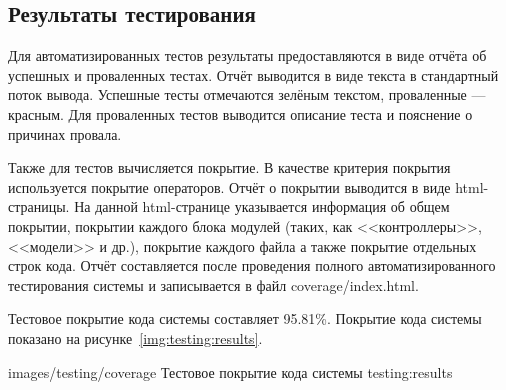 \subsection{Результаты тестирования}

Для автоматизированных тестов результаты предоставляются в виде отчёта об успешных и проваленных тестах. Отчёт выводится в виде текста в стандартный поток вывода. Успешные тесты отмечаются зелёным текстом, проваленные --- красным. Для проваленных тестов выводится описание теста и пояснение о причинах провала.

Также для тестов вычисляется покрытие. В качестве критерия покрытия используется покрытие операторов. Отчёт о покрытии выводится в виде html-страницы. На данной html-странице указывается информация об общем покрытии, покрытии каждого блока модулей (таких, как <<контроллеры>>, <<модели>> и др.), покрытие каждого файла а также покрытие отдельных строк кода. Отчёт составляется после проведения полного автоматизированного тестирования системы и записывается в файл coverage/index.html.

Тестовое покрытие кода системы составляет 95.81\%. Покрытие кода системы показано на рисунке~\ref{img:testing:results}.

            {images/testing/coverage}
            {Тестовое покрытие кода системы}
            {testing:results}

